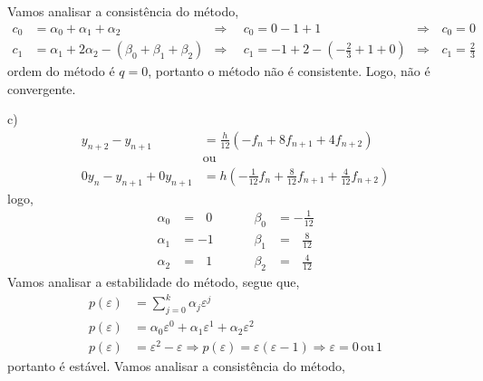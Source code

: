\documentclass[a4paper,12pt]{article}
\begin{document}
Vamos analisar a consist\^encia do m\'etodo,
	\begin{align*}
		c_{0} &= \alpha_{0} + \alpha_{1} + \alpha_{2} &\Rightarrow \hspace{6pt} &c_{0} = 0 -1 + 1 &\Rightarrow
		\hspace{2pt} &c_{0} =
		0\\
		c_{1} &= \alpha_{1} + 2\alpha_{2} -(\beta_{0} + \beta_{1} + \beta_{2}) &\Rightarrow \hspace{6pt} &c_{1} = -1 +
		2 - (-\frac{2}{3} + 1 + 0) &\Rightarrow \hspace{2pt} &c_{1} = \frac{2}{3}
	\end{align*}
ordem do m\'etodo \'e $q = 0$, portanto o m\'etodo n\~ao \'e consistente. Logo, n\~ao \'e convergente.

c)
	\begin{align*}
		y_{n+2} - y_{n+1} &= \frac{h}{12}(-f_{n} + 8f_{n+1} + 4f_{n+2})\\
		&\mbox{ou}\\
		0y_{n} - y_{n+1} + 0y_{n+1} &= h(-\frac{1}{12}f_{n} + \frac{8}{12}f_{n+1} + \frac{4}{12}f_{n+2})
	\end{align*}
logo,
	\begin{align*}
		\alpha_{0} &=\hspace{8pt} 0 \hspace{1cm}& \beta_{0} &= -\frac{1}{12}\\
		\alpha_{1} &= -1 \hspace{1cm}& \beta_{1} &= \hspace{8pt} \frac{8}{12}\\
		\alpha_{2} &=\hspace{8pt} 1 \hspace{1cm}& \beta_{2} &= \hspace{8pt} \frac{4}{12}
	\end{align*}
Vamos analisar a estabilidade do m\'etodo,
segue que,
	\begin{align*}
		p(\varepsilon) &= \sum_{j=0}^{k}\alpha_{j}\varepsilon^{j} \\
		p(\varepsilon) &= \alpha_{0}\varepsilon^{0} + \alpha_{1}\varepsilon^{1} + \alpha_{2}\varepsilon^{2}\\
		p(\varepsilon) &= \varepsilon^{2} -\varepsilon \Rightarrow p(\varepsilon) = \varepsilon(\varepsilon - 1)
		\Rightarrow \varepsilon = 0 \hspace{2pt} \mbox{ou} \hspace{2pt} 1
	\end{align*}
portanto \'e est\'avel.
Vamos analisar a consist\^encia do m\'etodo,
\end{document}
